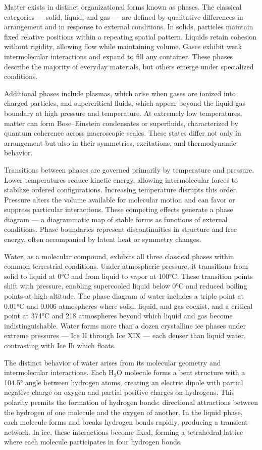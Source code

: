 Matter exists in distinct organizational forms known as phases. The classical categories — solid, liquid, and gas — are defined by qualitative differences in arrangement and in response to external conditions. In solids, particles maintain fixed relative positions within a repeating spatial pattern. Liquids retain cohesion without rigidity, allowing flow while maintaining volume. Gases exhibit weak intermolecular interactions and expand to fill any container. These phases describe the majority of everyday materials, but others emerge under specialized conditions.

Additional phases include plasmas, which arise when gases are ionized into charged particles, and supercritical fluids, which appear beyond the liquid-gas boundary at high pressure and temperature. At extremely low temperatures, matter can form Bose–Einstein condensates or superfluids, characterized by quantum coherence across macroscopic scales. These states differ not only in arrangement but also in their symmetries, excitations, and thermodynamic behavior.

Transitions between phases are governed primarily by temperature and pressure. Lower temperatures reduce kinetic energy, allowing intermolecular forces to stabilize ordered configurations. Increasing temperature disrupts this order. Pressure alters the volume available for molecular motion and can favor or suppress particular interactions. These competing effects generate a phase diagram — a diagrammatic map of stable forms as functions of external conditions. Phase boundaries represent discontinuities in structure and free energy, often accompanied by latent heat or symmetry changes.

Water, as a molecular compound, exhibits all three classical phases within common terrestrial conditions. Under atmospheric pressure, it transitions from solid to liquid at 0°C and from liquid to vapor at 100°C. These transition points shift with pressure, enabling supercooled liquid below 0°C and reduced boiling points at high altitude. The phase diagram of water includes a triple point at 0.01°C and 0.006 atmospheres where solid, liquid, and gas coexist, and a critical point at 374°C and 218 atmospheres beyond which liquid and gas become indistinguishable. Water forms more than a dozen crystalline ice phases under extreme pressures — Ice II through Ice XIX — each denser than liquid water, contrasting with Ice Ih which floats.

The distinct behavior of water arises from its molecular geometry and intermolecular interactions. Each H\(_2\)O molecule forms a bent structure with a 104.5° angle between hydrogen atoms, creating an electric dipole with partial negative charge on oxygen and partial positive charges on hydrogens. This polarity permits the formation of hydrogen bonds: directional attractions between the hydrogen of one molecule and the oxygen of another. In the liquid phase, each molecule forms and breaks hydrogen bonds rapidly, producing a transient network. In ice, these interactions become fixed, forming a tetrahedral lattice where each molecule participates in four hydrogen bonds.


